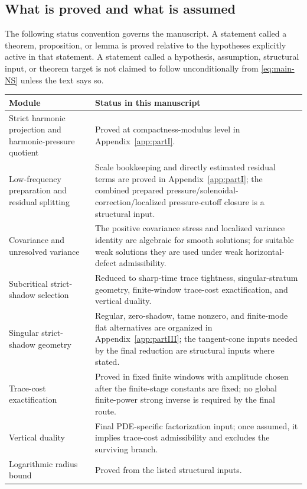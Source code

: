 \documentclass[11pt]{article}
\numberwithin{equation}{section}
\theoremstyle{plain}
\theoremstyle{definition}
\theoremstyle{remark}
\begin{document}
\subsection{What is proved and what is assumed}\label{subsec:main-status}

The following status convention governs the manuscript.  A statement called a theorem, proposition, or lemma is proved relative to the hypotheses explicitly active in that statement.  A statement called a hypothesis, assumption, structural input, or theorem target is not claimed to follow unconditionally from \eqref{eq:main-NS} unless the text says so.

\begin{center}
\renewcommand{\arraystretch}{1.16}
\begin{tabular}{p{}p{}}
\hline
Module & Status in this manuscript \\
\hline
Strict harmonic projection and harmonic-pressure quotient & Proved at compactness-modulus level in Appendix~\ref{app:partI}. \\
Low-frequency preparation and residual splitting & Scale bookkeeping and directly estimated residual terms are proved in Appendix~\ref{app:partI}; the combined prepared pressure/solenoidal-correction/localized pressure-cutoff closure is a structural input. \\
Covariance and unresolved variance & The positive covariance stress and localized variance identity are algebraic for smooth solutions; for suitable weak solutions they are used under weak horizontal-defect admissibility. \\
Subcritical strict-shadow selection & Reduced to sharp-time trace tightness, singular-stratum geometry, finite-window trace-cost exactification, and vertical duality. \\
Singular strict-shadow geometry & Regular, zero-shadow, tame nonzero, and finite-mode flat alternatives are organized in Appendix~\ref{app:partIII}; the tangent-cone inputs needed by the final reduction are structural inputs where stated. \\
Trace-cost exactification & Proved in fixed finite windows with amplitude chosen after the finite-stage constants are fixed; no global finite-power strong inverse is required by the final route. \\
Vertical duality & Final PDE-specific factorization input; once assumed, it implies trace-cost admissibility and excludes the surviving branch. \\
Logarithmic radius bound & Proved from the listed structural inputs. \\
\hline
\end{tabular}
\end{center}
\end{document}
